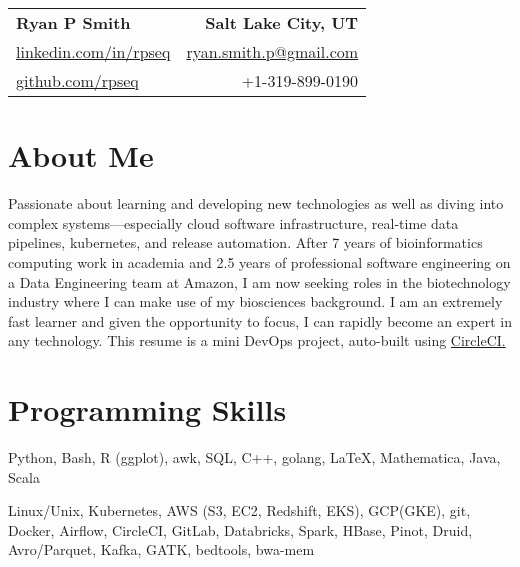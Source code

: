 
\RequirePackage{preamble}



\begin{tabular*}{\textwidth}{l@{\extracolsep{\fill}}r}
    \textbf{{\Large Ryan P Smith}} & \textbf{Salt Lake City, UT} \\
    \href{http://www.linkedin.com/in/rpseq}{linkedin.com/in/rpseq} &
    \href{mailto:ryan.smith.p@gmail.com}{ryan.smith.p@gmail.com} \\
    \href{https://github.com/RPSeq}{github.com/rpseq} & +1-319-899-0190 \\
\end{tabular*}

\section{About Me}
      
   \small{Passionate about learning and developing new technologies as well as diving into complex systems---especially cloud software infrastructure, real-time data pipelines, kubernetes, and release automation. After 7 years of bioinformatics computing work in academia and 2.5 years of professional software engineering on a Data Engineering team at Amazon, I am now seeking roles in the biotechnology industry where I can make use of my biosciences background. I am an extremely fast learner and given the opportunity to focus, I can rapidly become an expert in any technology. This resume is a mini DevOps project, auto-built using \href{https://circleci.com/gh/RPSeq/resume}{CircleCI.}}

    
\section{Programming Skills}
    \resumeSubHeadingListStart

        {Python, Bash, R (ggplot), awk, SQL, C++, golang, \LaTeX, Mathematica, Java, Scala}
          
        {Linux/Unix, Kubernetes, AWS (S3, EC2, Redshift, EKS), GCP(GKE), git, Docker, Airflow, CircleCI, GitLab, Databricks, Spark, HBase, Pinot, Druid, Avro/Parquet, Kafka, GATK, bedtools, bwa-mem}
          
